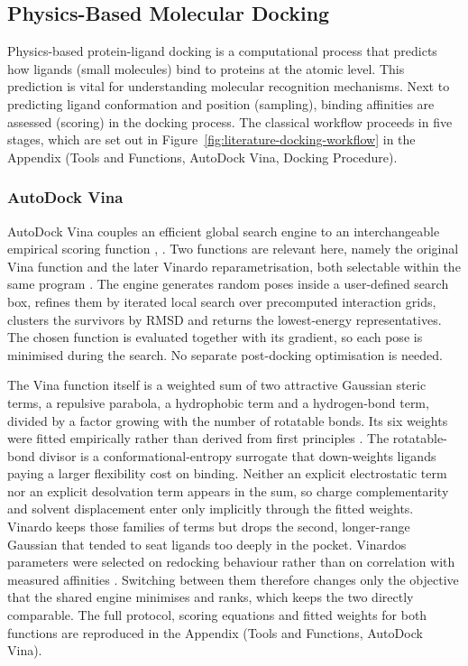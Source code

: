 \hypertarget{physics-based-molecular-docking}{%
\subsection{Physics-Based Molecular Docking}\label{physics-based-molecular-docking}}

Physics-based protein-ligand docking is a computational process that predicts how ligands (small molecules) bind to proteins at the atomic level. This prediction is vital for understanding molecular recognition mechanisms. Next to predicting ligand conformation and position (sampling), binding affinities are assessed (scoring) in the docking process. The classical workflow proceeds in five stages, which are set out in Figure~\ref{fig:literature-docking-workflow} in the Appendix (Tools and Functions, AutoDock Vina, Docking Procedure).

\hypertarget{autodock-vina}{%
\subsubsection{AutoDock Vina}\label{autodock-vina}}

AutoDock Vina couples an efficient global search engine to an interchangeable empirical scoring function \cite{ref022}, \cite{ref023}. Two functions are relevant here, namely the original Vina function and the later Vinardo reparametrisation, both selectable within the same program \cite{ref023}. The engine generates random poses inside a user-defined search box, refines them by iterated local search over precomputed interaction grids, clusters the survivors by RMSD and returns the lowest-energy representatives. The chosen function is evaluated together with its gradient, so each pose is minimised during the search. No separate post-docking optimisation is needed.

The Vina function itself is a weighted sum of two attractive Gaussian steric terms, a repulsive parabola, a hydrophobic term and a hydrogen-bond term, divided by a factor growing with the number of rotatable bonds. Its six weights were fitted empirically rather than derived from first principles \cite{ref022}. The rotatable-bond divisor is a conformational-entropy surrogate that down-weights ligands paying a larger flexibility cost on binding. Neither an explicit electrostatic term nor an explicit desolvation term appears in the sum, so charge complementarity and solvent displacement enter only implicitly through the fitted weights. Vinardo keeps those families of terms but drops the second, longer-range Gaussian that tended to seat ligands too deeply in the pocket. Vinardo\textquotesingle s parameters were selected on redocking behaviour rather than on correlation with measured affinities \cite{ref073}. Switching between them therefore changes only the objective that the shared engine minimises and ranks, which keeps the two directly comparable. The full protocol, scoring equations and fitted weights for both functions are reproduced in the Appendix (Tools and Functions, AutoDock Vina).

